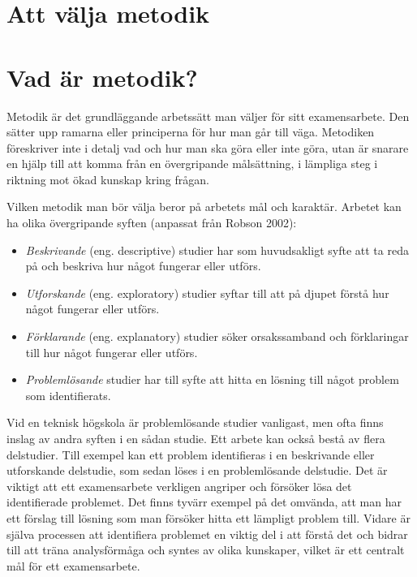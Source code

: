 \section{Att välja metodik}\label{att-vuxe4lja-metodik}

\section{Vad är metodik?}\label{vad-uxe4r-metodik}

Metodik är det grundläggande arbetssätt man väljer för sitt
examensarbete. Den sätter upp ramarna eller principerna för hur man går
till väga. Metodiken föreskriver inte i detalj vad och hur man ska göra
eller inte göra, utan är snarare en hjälp till att komma från en
övergripande målsättning, i lämpliga steg i riktning mot ökad kunskap
kring frågan.

Vilken metodik man bör välja beror på arbetets mål och karaktär. Arbetet
kan ha olika övergripande syften (anpassat från Robson 2002):

\begin{itemize}
\item
  \emph{Beskrivande} (eng. descriptive) studier har som huvudsakligt
  syfte att ta reda på och beskriva hur något fungerar eller utförs.
\item
  \emph{Utforskande} (eng. exploratory) studier syftar till att på
  djupet förstå hur något fungerar eller utförs.
\item
  \emph{Förklarande} (eng. explanatory) studier söker orsakssamband och
  förklaringar till hur något fungerar eller utförs.
\item
  \emph{Problemlösande} studier har till syfte att hitta en lösning till
  något problem som identifierats.
\end{itemize}

Vid en teknisk högskola är problemlösande studier vanligast, men ofta
finns inslag av andra syften i en sådan studie. Ett arbete kan också
bestå av flera delstudier. Till exempel kan ett problem identifieras i
en beskrivande eller utforskande delstudie, som sedan löses i en
problemlösande delstudie. Det är viktigt att ett examensarbete verkligen
angriper och försöker lösa det identifierade problemet. Det finns tyvärr
exempel på det omvända, att man har ett förslag till lösning som man
försöker hitta ett lämpligt problem till. Vidare är själva processen att
identifiera problemet en viktig del i att förstå det och bidrar till att
träna analysförmåga och syntes av olika kunskaper, vilket är ett
centralt mål för ett examensarbete.

